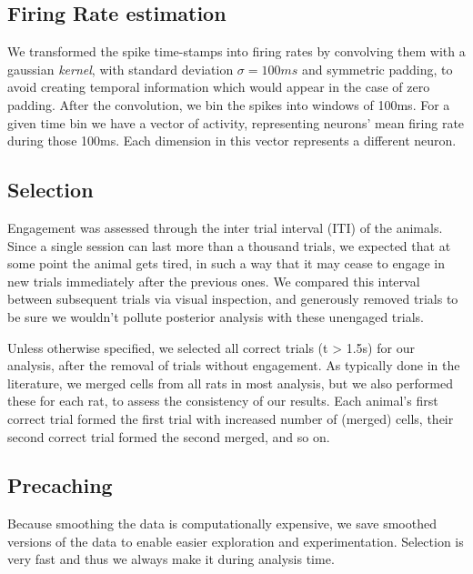 \subsection{Firing Rate estimation}
    We transformed the spike time-stamps into firing rates by convolving them with a gaussian \textit{kernel}, with standard deviation $\sigma = 100ms$ and symmetric padding, to avoid creating temporal information which would appear in the case of zero padding. After the convolution, we bin the spikes into windows of 100ms. For a given time bin we have a vector of activity, representing neurons' mean firing rate during those 100ms. Each dimension in this vector represents a different neuron.
    

\subsection{Selection}
    Engagement was assessed through the inter trial interval (ITI) of the animals. Since a single session can last more than a thousand trials, we expected that at some point the animal gets tired, in such a way that it may cease to engage in new trials immediately after the previous ones. We compared this interval between subsequent trials via visual inspection, and generously removed trials to be sure we wouldn't pollute posterior analysis with these unengaged trials.
    
    Unless otherwise specified, we selected all correct trials (t > 1.5s) for our analysis, after the removal of trials without engagement. 
    As typically done in the literature, we merged cells from all rats in most analysis, but we also performed these for each rat, to assess the consistency of our results. Each animal's first correct trial formed the first trial with increased number of (merged) cells, their second correct trial formed the second merged, and so on.
    
\subsection{Precaching}
    Because smoothing the data is computationally expensive, we save smoothed versions of the data to enable easier exploration and experimentation. Selection is very fast and thus we always make it during analysis time.